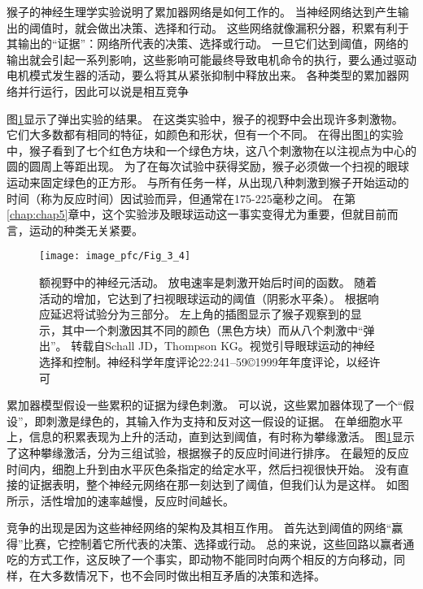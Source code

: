 猴子的神经生理学实验说明了累加器网络是如何工作的。
当神经网络达到产生输出的阈值时，就会做出决策、选择和行动。
这些网络就像漏积分器，积累有利于其输出的“证据”：网络所代表的决策、选择或行动。
一旦它们达到阈值，网络的输出就会引起一系列影响，这些影响可能最终导致电机命令的执行，要么通过驱动电机模式发生器的活动，要么将其从紧张抑制中释放出来。
各种类型的累加器网络并行运行，因此可以说是相互竞争\par


图\ref{fig:3_4}显示了弹出实验的结果。
在这类实验中，猴子的视野中会出现许多刺激物。
它们大多数都有相同的特征，如颜色和形状，但有一个不同。
在得出图\ref{fig:3_4}的实验中，猴子看到了七个红色方块和一个绿色方块，这八个刺激物在以注视点为中心的圆的圆周上等距出现。
为了在每次试验中获得奖励，猴子必须做一个扫视的眼球运动来固定绿色的正方形。
与所有任务一样，从出现八种刺激到猴子开始运动的时间（称为反应时间）因试验而异，但通常在175-225毫秒之间。
在第\ref{chap:chap5}章中，这个实验涉及眼球运动这一事实变得尤为重要，但就目前而言，运动的种类无关紧要。\par


\begin{figure}[!htb]
	\centering
	\texttt{[image: image\_pfc/Fig\_3\_4]}
	\caption{额视野中的神经元活动。
		放电速率是刺激开始后时间的函数。
		随着活动的增加，它达到了扫视眼球运动的阈值（阴影水平条）。
		根据响应延迟将试验分为三部分。
		左上角的插图显示了猴子观察到的显示，其中一个刺激因其不同的颜色（黑色方块）而从八个刺激中“弹出”。
		转载自Schall JD，Thompson KG。视觉引导眼球运动的神经选择和控制。神经科学年度评论22:241–59©1999年年度评论，以经许可}
	\label{fig:3_4}
\end{figure}


累加器模型假设一些累积的证据为绿色刺激。
可以说，这些累加器体现了一个“假设”，即刺激是绿色的，其输入作为支持和反对这一假设的证据。
在单细胞水平上，信息的积累表现为上升的活动，直到达到阈值，有时称为攀缘激活。
图\ref{fig:3_4}显示了这种攀缘激活，分为三组试验，根据猴子的反应时间进行排序。
在最短的反应时间内，细胞上升到由水平灰色条指定的给定水平，然后扫视很快开始。
没有直接的证据表明，整个神经元网络在那一刻达到了阈值，但我们认为是这样。
如图所示，活性增加的速率越慢，反应时间越长。\par


竞争的出现是因为这些神经网络的架构及其相互作用。
首先达到阈值的网络“赢得”比赛，它控制着它所代表的决策、选择或行动。
总的来说，这些回路以赢者通吃的方式工作，这反映了一个事实，即动物不能同时向两个相反的方向移动，同样，在大多数情况下，也不会同时做出相互矛盾的决策和选择。\par



